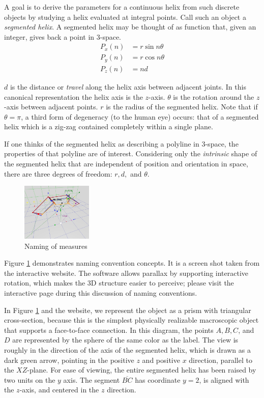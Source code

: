 \documentclass{svproc}
\begin{document}
A goal is to derive
the parameters for a continuous helix from such discrete objects by studying
a helix evaluated at integral points. Call such an object a {\em segmented helix}.
A segmented helix may be thought of as function that, given an integer, gives back a point in
3-space.
\begin{align}
    P_x(n) &= r \sin{n \theta}  \\
    P_y(n) &= r \cos{n \theta} \\
   P_z(n) &= n d
\end{align}

$d$ is the distance or {\em travel} along the helix axis between adjacent joints. In this canonical representation the helix axis is
the $z$-axis.
$\theta$ is the rotation around the $z$-axis
between adjacent points.
$r$ is the radius of the segmented helix.
Note that if $\theta = \pi$, a third form of degeneracy (to the human eye) occurs:
that of a segmented helix
which is a zig-zag contained completely within a single plane.

If one thinks of the segmented helix as describing a polyline in 3-space,
the properties of that polyline are of interest.
Considering only the {\em intrinsic} shape of the segmented helix that
are independent of position and orientation in space,
there are three degrees
of freedom: $r,d,$ and $\theta$.

\begin{figure}
     \centering
     \includegraphics[width=0.30\textwidth]{figures/ABCDFigure.png}
     \caption{Naming of measures}
  \label{fig:naming}
\end{figure}

Figure \ref{fig:naming} demonstrates naming convention concepts.
It is a screen shot taken from the interactive website\cite{segmentedhelixinteractive}.
The software allows parallax by supporting interactive rotation,
which makes the 3D structure easier to perceive;
please visit the interactive page during this discussion of naming conventions.

In Figure \ref{fig:naming} and the website, we represent the object as a prism
with triangular cross-section, because this is
the simplest physically realizable macroscopic object that supports a face-to-face connection.
In this diagram, the
points $A,B,C$, and $D$ are represented by the sphere of the same color as the label. The view is roughly in the direction of
the axis of the segmented helix, which is drawn as a dark green arrow, pointing in the positive $z$ and positive $x$ direction,
parallel to the $XZ$-plane.
For ease of viewing, the entire segmented helix has been raised by two units on the $y$ axis.
The segment $\overline{BC}$ has coordinate $y = 2$, is aligned with the $z$-axis, and centered in the $z$ direction.
\end{document}
